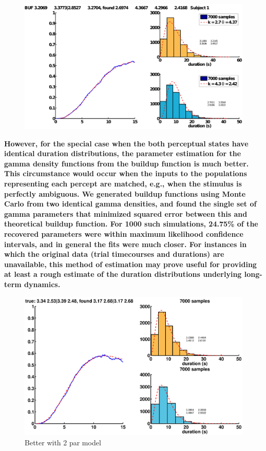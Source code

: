 \documentclass[10pt]{article}
\begin{document}
\begin{figure}
	\centering
	\includegraphics[scale=.45]{../reverse_fit1}
	\caption{}
	\label{fig:reverse_fit}
\end{figure}

\textbf{However, for the special case when the both perceptual states have identical duration distributions, the parameter estimation for the gamma density functions from the buildup function is much better. This circumstance would occur when the inputs to the populations representing each percept are matched, e.g., when the stimulus is perfectly ambiguous. We generated buildup functions using Monte Carlo from two identical gamma densities, and found the single set of gamma parameters that minimized squared error between this and theoretical buildup function. For 1000 such simulations, 24.75\% of the recovered parameters were within maximum likelihood confidence intervals, and in general the fits were much closer. For instances in which the original data (trial timecourses and durations) are unavailable, this method of estimation may prove useful for providing at least a rough estimate of the duration distributions underlying long-term dynamics.}

\begin{figure}
	\centering
	\includegraphics[scale=.45]{../2parReverseFits/ex1}
	\caption{Better with 2 par model}
	\label{fig:2par_reverse_fit}
\end{figure}
\end{document}

